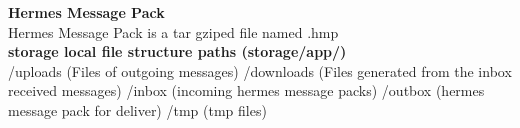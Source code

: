 \documentclass[11pt,a4paper]{article}
\begin{document}
\textbf{Hermes Message Pack}\\
Hermes Message Pack is a tar gziped file named .hmp\\

\textbf{storage local file structure paths (storage/app/)}\\
/uploads (Files of outgoing messages)
/downloads (Files generated from the inbox received messages)
/inbox (incoming hermes message packs)
/outbox (hermes message pack for deliver)
/tmp (tmp files)





\end{document}
